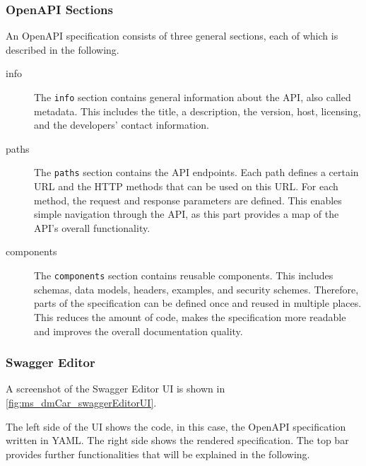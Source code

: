 \subsubsection*{OpenAPI Sections}
An OpenAPI specification consists of three general sections, each of which is described in the following.
\begin{description}
    \item[info] The \texttt{info} section contains general information about the API, also called metadata.
                This includes the title, a description, the version, host, licensing, and the developers' contact information.
    \item[paths] The \texttt{paths} section contains the API endpoints.
                Each path defines a certain URL and the HTTP methods that can be used on this URL.
                For each method, the request and response parameters are defined.
                This enables simple navigation through the API, as this part provides a map of the API's overall functionality.
    \item[components] The \texttt{components} section contains reusable components.
                This includes schemas, data models, headers, examples, and security schemes.
                Therefore, parts of the specification can be defined once and reused in multiple places.
                This reduces the amount of code, makes the specification more readable and improves the overall documentation quality.
\end{description}

\subsubsection*{Swagger Editor}
A screenshot of the Swagger Editor UI \cite{SWA-EDI} is shown in \autoref{fig:ms_dmCar_swaggerEditorUI}.

The left side of the UI shows the code, in this case, the OpenAPI specification written in YAML.
The right side shows the rendered specification.
The top bar provides further functionalities that will be explained in the following.

